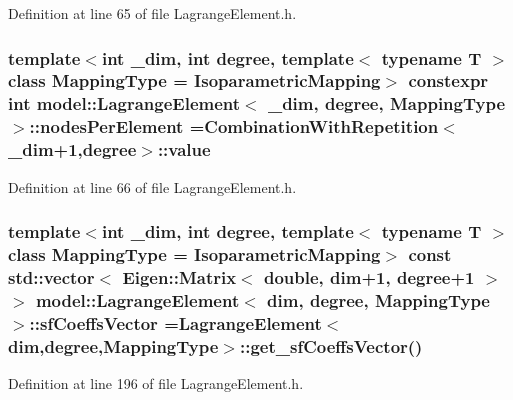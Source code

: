 Definition at line 65 of file Lagrange\+Element.\+h.

\hypertarget{classmodel_1_1_lagrange_element_a8f86452dcb9f1cc89fdbc0219c397d05}{}
\subsubsection[{nodes\+Per\+Element}]{\setlength{\rightskip}{0pt plus 5cm}template$<$int \+\_\+dim, int degree, template$<$ typename T $>$ class Mapping\+Type = Isoparametric\+Mapping$>$ constexpr int {\bf model\+::\+Lagrange\+Element}$<$ \+\_\+dim, degree, Mapping\+Type $>$\+::nodes\+Per\+Element ={\bf Combination\+With\+Repetition}$<$\+\_\+dim+1,degree$>$\+::value\hspace{0.3cm}{\ttfamily [static]}}\label{classmodel_1_1_lagrange_element_a8f86452dcb9f1cc89fdbc0219c397d05}


Definition at line 66 of file Lagrange\+Element.\+h.

\hypertarget{classmodel_1_1_lagrange_element_a7f69e38490f0b6ab5c94835146a860f6}{}
\subsubsection[{sf\+Coeffs\+Vector}]{\setlength{\rightskip}{0pt plus 5cm}template$<$int \+\_\+dim, int degree, template$<$ typename T $>$ class Mapping\+Type = Isoparametric\+Mapping$>$ const std\+::vector$<$ Eigen\+::\+Matrix$<$ double, {\bf dim}+1, degree+1 $>$ $>$ {\bf model\+::\+Lagrange\+Element}$<$ {\bf dim}, degree, Mapping\+Type $>$\+::sf\+Coeffs\+Vector ={\bf Lagrange\+Element}$<${\bf dim},degree,Mapping\+Type$>$\+::get\+\_\+sf\+Coeffs\+Vector()\hspace{0.3cm}{\ttfamily [static]}}\label{classmodel_1_1_lagrange_element_a7f69e38490f0b6ab5c94835146a860f6}


Definition at line 196 of file Lagrange\+Element.\+h.

\hypertarget{classmodel_1_1_lagrange_element_add9757431ae75842eabec77a4bf0c525}{}
